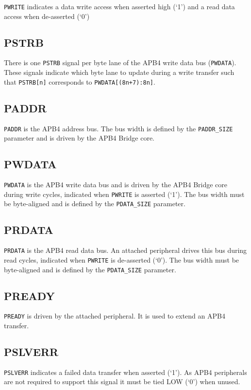 \texttt{PWRITE} indicates a data write access when asserted high (`1') and a read
data access when de-asserted (`0')

\subsection{PSTRB}\label{pstrb}

There is one \texttt{PSTRB} signal per byte lane of the APB4 write data bus
(\texttt{PWDATA}). These signals indicate which byte lane to update during a
write transfer such that \texttt{PSTRB[n]} corresponds to
\texttt{PWDATA[(8n+7):8n]}.

\subsection{PADDR}\label{paddr}

\texttt{PADDR} is the APB4 address bus. The bus width is defined by the
\texttt{PADDR\_SIZE} parameter and is driven by the APB4 Bridge core.

\subsection{PWDATA}\label{pwdata}

\texttt{PWDATA} is the APB4 write data bus and is driven by the APB4 Bridge core
during write cycles, indicated when \texttt{PWRITE} is asserted (`1'). The bus
width must be byte-aligned and is defined by the \texttt{PDATA\_SIZE} parameter.

\subsection{PRDATA}\label{prdata}

\texttt{PRDATA} is the APB4 read data bus. An attached peripheral drives this bus
during read cycles, indicated when \texttt{PWRITE} is de-asserted (`0'). The bus
width must be byte-aligned and is defined by the \texttt{PDATA\_SIZE} parameter.

\subsection{PREADY}\label{pready}

\texttt{PREADY} is driven by the attached peripheral. It is used to extend an
APB4 transfer.

\subsection{PSLVERR}\label{pslverr}

\texttt{PSLVERR} indicates a failed data transfer when asserted (`1'). As APB4
peripherals are not required to support this signal it must be tied LOW
(`0') when unused.